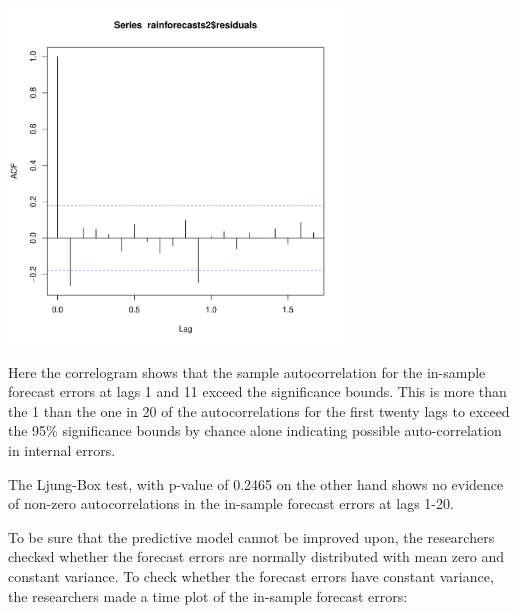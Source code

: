 \begin{center}
\includegraphics[width=0.7\maxwidth,height=3.5in]{figure/listings-HWComputations4}
\end{center}

Here the correlogram shows that the sample autocorrelation for the in-sample forecast errors at lags 1 and 11 exceed
the significance bounds. This is more than the 1 than the one in 20 of the autocorrelations for the first twenty lags to
exceed the 95\% significance bounds by chance alone indicating possible auto-correlation in internal errors. 


The Ljung-Box test, with p-value of 0.2465 on the other hand shows no evidence of non-zero autocorrelations in the in-sample forecast errors at lags 1-20.

To be sure that the predictive model cannot be improved upon, the researchers checked whether the forecast errors are normally distributed with mean zero and constant variance. To check whether the forecast errors have
constant variance, the researchers made a time plot of the in-sample forecast errors:

